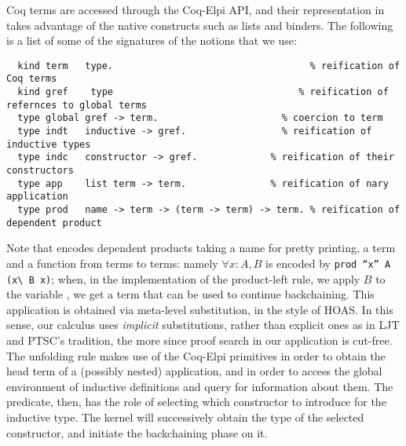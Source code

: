 
Coq terms are accessed through the Coq-Elpi API, and their representation
in \lP takes advantage of the native \lP constructs such as lists and binders.
The following is a list of some of the signatures of the notions that we use:
\begin{lstlisting}
  kind term   type.                                   % reification of Coq terms
  kind gref    type                                 % reification of refernces to global terms
  type global gref -> term.                      % coercion to term
  type indt   inductive -> gref.                 % reification of inductive types
  type indc   constructor -> gref.             % reification of their constructors 
  type app    list term -> term.               % reification of nary application
  type prod   name -> term -> (term -> term) -> term. % reification of dependent product
\end{lstlisting}

Note that  encodes dependent products taking a name for pretty
printing, a term and a \lP function from terms to terms: namely $\forall x :
A, B$ is encoded by \texttt{prod ``x'' A (x\textbackslash{} B x)}; when, in the
implementation of the product-left rule, we apply $B$ to the variable
, we get a term that can be used to continue backchaining. This
application is obtained via meta-level substitution, in the style of HOAS. In
this sense, our calculus uses \emph{implicit} substitutions, rather than
explicit ones as in LJT and PTSC's tradition, the more since proof search in
our application is cut-free.
The unfolding rule makes use of the Coq-Elpi primitives
 in order to obtain the head term of a (possibly
nested) application, and  in order to access the global
environment of inductive definitions and query for information about them.
The  predicate, then, has the role of selecting which
constructor to introduce for the inductive type. The kernel will successively
obtain the type of the selected constructor, and initiate the backchaining
phase on it.

